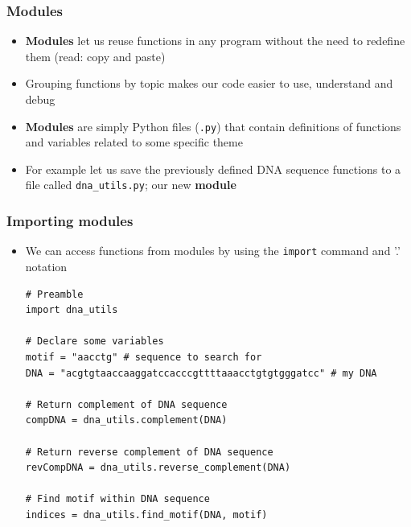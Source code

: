 \documentclass[xcolor=table]{beamer}
\begin{document}
\begin{frame}[fragile]
\frametitle{Modules}

\begin{itemize}\addtolength{\itemsep}{1.2\baselineskip}
	
	\item<1-> \textbf{Modules} let us reuse functions in any program 
	without the need to redefine them (read: copy and paste)

	\item<2-> Grouping functions by topic makes our code easier to use, understand and debug

	\item<3-> \textbf{Modules} are simply Python files (\texttt{.py}) that contain
	definitions of functions and variables related to some specific theme

	\item<4-> For example let us save the previously defined DNA sequence functions
	to a file called \texttt{dna\_utils.py}; our new \textbf{module}
	 

\end{itemize}
\end{frame}

\begin{frame}[fragile]
\frametitle{Importing modules}

\begin{itemize}\addtolength{\itemsep}{\baselineskip}

	\item We can access functions from modules by using the \texttt{import} command
	and '.' notation

\begin{lstlisting}[style=python]
# Preamble
import dna_utils

# Declare some variables
motif = "aacctg" # sequence to search for
DNA = "acgtgtaaccaaggatccacccgttttaaacctgtgtgggatcc" # my DNA

# Return complement of DNA sequence
compDNA = dna_utils.complement(DNA)

# Return reverse complement of DNA sequence
revCompDNA = dna_utils.reverse_complement(DNA)

# Find motif within DNA sequence 
indices = dna_utils.find_motif(DNA, motif)
\end{lstlisting}

\end{itemize}

\end{frame}
\end{document}
